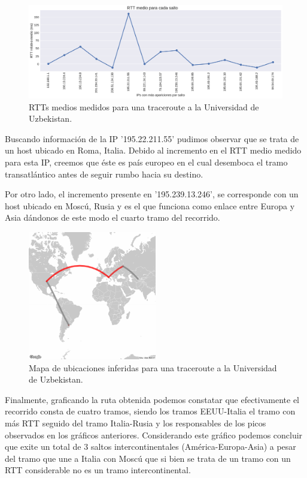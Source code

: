 \begin{figure}[H]
   \centering
       \includegraphics[width=1\textwidth, height=1\textheight, keepaspectratio]{../img/nuu-uz-rtts}
 \caption{RTTs medios medidos para una traceroute a la Universidad de Uzbekistan.}
 \label{fig:nuu-uz-rtts}
\end{figure}

Buscando información de la IP '195.22.211.55' pudimos observar que se trata de un host ubicado en Roma, Italia. Debido al incremento en el RTT medio medido para esta IP, creemos que éste es país europeo en el cual desemboca el tramo transatlántico antes de seguir rumbo hacia su destino. \par

Por otro lado, el incremento presente en '195.239.13.246', se corresponde con un host ubicado en Moscú, Rusia y es el que funciona como enlace entre Europa y Asia dándonos de este modo el cuarto tramo del recorrido.\par

\begin{figure}[H]
   \centering
       \includegraphics[width=0.5\textwidth, keepaspectratio]{../img/nuu-uz-map}
 \caption{Mapa de ubicaciones inferidas para una traceroute a la Universidad de Uzbekistan.}
 \label{fig:nuu-uz-map}
\end{figure}


Finalmente, graficando la ruta obtenida podemos constatar que efectivamente el recorrido consta de cuatro tramos, siendo los tramos EEUU-Italia el tramo con más RTT seguido del tramo Italia-Rusia y los responsables de los picos observados en los gráficos anteriores. Considerando este gráfico podemos concluir que exite un total de 3 saltos intercontinentales (América-Europa-Asia) a pesar del tramo que une a Italia con Moscú que si bien se trata de un tramo con un RTT considerable no es un tramo intercontinental.\par

